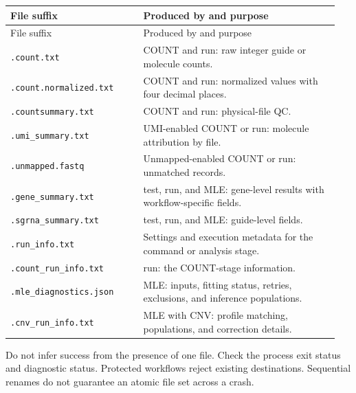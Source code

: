 \documentclass[11pt,a4paper]{article}
\begin{document}
\begingroup\small\setlength{\tabcolsep}{5pt}
\begin{longtable}{@{}>{\raggedright\arraybackslash}p{0.38\linewidth}>{\raggedright\arraybackslash}p{0.57\linewidth}@{}}
\toprule
File suffix & Produced by and purpose \\
\midrule\endfirsthead
\toprule
File suffix & Produced by and purpose \\
\midrule\endhead
\bottomrule\endfoot
\texttt{\small .\allowbreak{}count.\allowbreak{}txt} & COUNT and run: raw integer guide or molecule counts. \\
\texttt{\small .\allowbreak{}count.\allowbreak{}normalized.\allowbreak{}txt} & COUNT and run: normalized values with four decimal places. \\
\texttt{\small .\allowbreak{}countsummary.\allowbreak{}txt} & COUNT and run: physical-file QC. \\
\texttt{\small .\allowbreak{}umi\_\allowbreak{}summary.\allowbreak{}txt} & UMI-enabled COUNT or run: molecule attribution by file. \\
\texttt{\small .\allowbreak{}unmapped.\allowbreak{}fastq} & Unmapped-enabled COUNT or run: unmatched records. \\
\texttt{\small .\allowbreak{}gene\_\allowbreak{}summary.\allowbreak{}txt} & test, run, and MLE: gene-level results with workflow-specific fields. \\
\texttt{\small .\allowbreak{}sgrna\_\allowbreak{}summary.\allowbreak{}txt} & test, run, and MLE: guide-level fields. \\
\texttt{\small .\allowbreak{}run\_\allowbreak{}info.\allowbreak{}txt} & Settings and execution metadata for the command or analysis stage. \\
\texttt{\small .\allowbreak{}count\_\allowbreak{}run\_\allowbreak{}info.\allowbreak{}txt} & run: the COUNT-stage information. \\
\texttt{\small .\allowbreak{}mle\_\allowbreak{}diagnostics.\allowbreak{}json} & MLE: inputs, fitting status, retries, exclusions, and inference populations. \\
\texttt{\small .\allowbreak{}cnv\_\allowbreak{}run\_\allowbreak{}info.\allowbreak{}txt} & MLE with CNV: profile matching, populations, and correction details. \\
\end{longtable}\endgroup

Do not infer success from the presence of one file. Check the process exit status and diagnostic status. Protected workflows reject existing destinations. Sequential renames do not guarantee an atomic file set across a crash.
\end{document}
